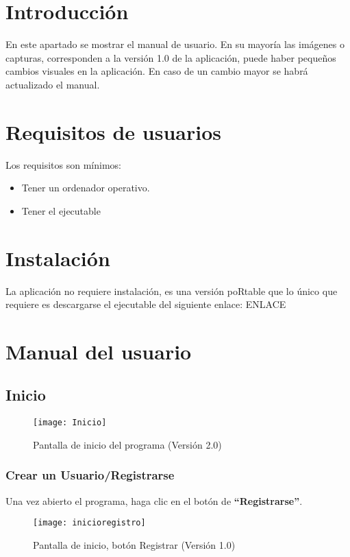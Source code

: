 
\section{Introducción}
En este apartado se mostrar el manual de usuario. En su mayoría las imágenes o capturas, corresponden a la versión 1.0 de la aplicación, puede haber pequeños cambios visuales en la aplicación. En caso de un cambio mayor se habrá actualizado el manual.
\section{Requisitos de usuarios}
Los requisitos son mínimos:
\begin{itemize}
\item Tener un ordenador operativo.
\item Tener el ejecutable
\end{itemize}
\section{Instalación}
La aplicación no requiere instalación, es una versión poRtable que lo único que requiere es descargarse el ejecutable del siguiente enlace: ENLACE
\section{Manual del usuario}
\subsection{Inicio}
\begin{figure}[htb]
\centering
\texttt{[image: Inicio]} 
\caption{Pantalla de inicio del programa (Versión 2.0)}
\end{figure}
\subsubsection{Crear un Usuario/Registrarse}
Una vez abierto el programa, haga clic en el botón de \textbf{“Registrarse”}. 
\begin{figure}[htb]
\centering
\texttt{[image: inicioregistro]} 
\caption{Pantalla de inicio, botón Registrar (Versión 1.0)}
\end{figure}

